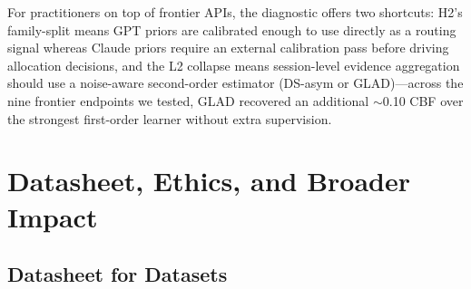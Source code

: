 \documentclass[11pt]{article}
\begin{document}
For practitioners on top of frontier APIs, the diagnostic offers two shortcuts: H2's family-split means GPT priors are calibrated enough to use directly as a routing signal whereas Claude priors require an external calibration pass before driving allocation decisions, and the L2 collapse means session-level evidence aggregation should use a noise-aware second-order estimator (DS-asym or GLAD)---across the nine frontier endpoints we tested, GLAD recovered an additional $\sim$0.10 CBF over the strongest first-order learner without extra supervision.












\newpage
\appendix



\section{Datasheet, Ethics, and Broader Impact}
\label{app:group_a}

\subsection{Datasheet for Datasets}
\end{document}
